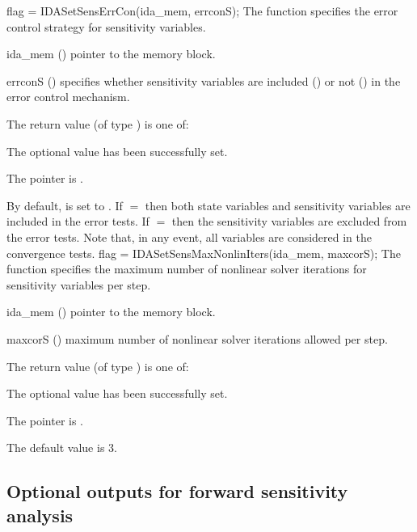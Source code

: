 {
  flag = IDASetSensErrCon(ida\_mem, errconS);
}
{
  The function  specifies the error control
  strategy for sensitivity variables.
}
{
  \begin{args}
  \item[ida\_mem] ()
    pointer to the {\idas} memory block.
  \item[errconS] ()
    specifies whether sensitivity variables are included () or not
    () in the error control mechanism.
  \end{args}
}
{
  The return value  (of type ) is one of:
  \begin{args}
  \item[\Id{IDA\_SUCCESS}] 
    The optional value has been successfully set.
  \item[\Id{IDA\_MEM\_NULL}]
    The  pointer is .
  \end{args}
}
{
  By default,  is set to . 
  If $=$ then both state variables and
  sensitivity variables are included in the error tests. 
  If $=$ then the sensitivity variables are excluded from the 
  error tests. Note that, in any event, all variables are considered in the convergence 
  tests.
}
{
  flag = IDASetSensMaxNonlinIters(ida\_mem, maxcorS);
}
{
  The function  specifies the maximum
  number of nonlinear solver iterations for sensitivity variables per step.
}
{
  \begin{args}
  \item[ida\_mem] ()
    pointer to the {\idas} memory block.
  \item[maxcorS] ()
    maximum number of nonlinear solver iterations allowed per step.
  \end{args}
}
{
  The return value  (of type ) is one of:
  \begin{args}
  \item[\Id{IDA\_SUCCESS}] 
    The optional value has been successfully set.
  \item[\Id{IDA\_MEM\_NULL}]
    The  pointer is .
  \end{args}
}
{
  The default value is $3$.
}

\subsection{Optional outputs for forward sensitivity analysis}
\label{ss:sens_optional_output}

